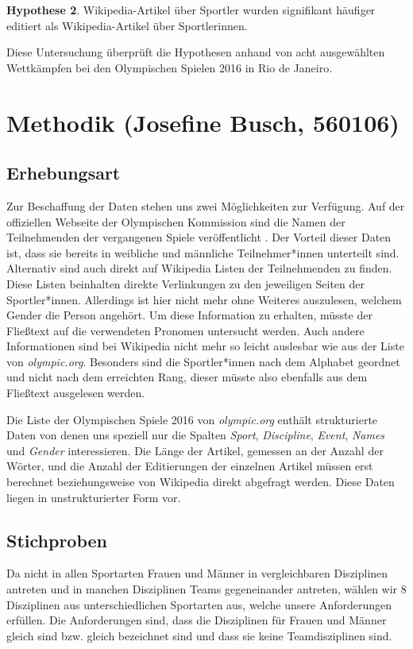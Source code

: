 \documentclass[11pt]{article}
\begin{document}
\textbf{Hypothese 2}. Wikipedia-Artikel über Sportler wurden signifikant häufiger editiert als Wikipedia-Artikel über Sportlerinnen.

Diese Untersuchung überprüft die Hypothesen anhand von acht ausgewählten Wettkämpfen bei den Olympischen Spielen 2016 in Rio de Janeiro.

\section{Methodik (Josefine Busch, 560106)}
\label{igw}

\subsection{Erhebungsart}
Zur Beschaffung der Daten stehen uns zwei Möglichkeiten zur Verfügung. Auf der offiziellen Webseite der Olympischen Kommission sind die Namen der Teilnehmenden der vergangenen Spiele veröffentlicht \parencite{olympicResults}. Der Vorteil dieser Daten ist, dass sie bereits in weibliche und männliche Teilnehmer*innen unterteilt sind. Alternativ sind auch direkt auf Wikipedia Listen der Teilnehmenden zu finden. \parencite{wikiOlympicComp} Diese Listen beinhalten direkte Verlinkungen zu den jeweiligen Seiten der Sportler*innen. Allerdings ist hier nicht mehr ohne Weiteres auszulesen, welchem Gender die Person angehört. Um diese Information zu erhalten, müsste der Fließtext auf die verwendeten Pronomen untersucht werden. Auch andere Informationen sind bei Wikipedia nicht mehr so leicht auslesbar wie aus der Liste von \textit{olympic.org}. Besonders sind die Sportler*innen nach dem Alphabet geordnet und nicht nach dem erreichten Rang, dieser müsste also ebenfalls aus dem Fließtext ausgelesen werden.

Die Liste der Olympischen Spiele 2016 von \textit{olympic.org} enthält strukturierte Daten von denen uns speziell nur die Spalten \textit{Sport}, \textit{Discipline}, \textit{Event}, \textit{Names} und \textit{Gender} interessieren.
Die Länge der Artikel, gemessen an der Anzahl der Wörter, und die Anzahl der Editierungen der einzelnen Artikel müssen erst berechnet beziehungsweise von Wikipedia direkt abgefragt werden. Diese Daten liegen in unstrukturierter Form vor.

\subsection{Stichproben}
Da nicht in allen Sportarten Frauen und Männer in vergleichbaren Disziplinen antreten und in manchen Disziplinen Teams gegeneinander antreten, wählen wir 8 Disziplinen aus unterschiedlichen Sportarten aus, welche unsere Anforderungen erfüllen. Die Anforderungen sind, dass die Disziplinen für Frauen und Männer gleich sind bzw. gleich bezeichnet sind und dass sie keine Teamdisziplinen sind.
\end{document}

